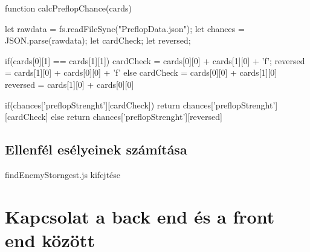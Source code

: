 \begin{python}
function calcPreflopChance(cards){
  let rawdata = fs.readFileSync("PreflopData.json");
  let chances = JSON.parse(rawdata);
  let cardCheck;
  let reversed;

  if(cards[0][1] == cards[1][1]){
    cardCheck = cards[0][0] + cards[1][0] + 'f';
    reversed = cards[1][0] + cards[0][0] + 'f'
  } else {
    cardCheck = cards[0][0] + cards[1][0]
    reversed = cards[1][0] + cards[0][0] 
  }

  if(chances['preflopStrenght'][cardCheck]){
    return chances['preflopStrenght'][cardCheck]
  } else {
    return chances['preflopStrenght'][reversed]
  }
}
\end{python}

\subsection{Ellenfél esélyeinek számítása}
findEnemyStorngest.js kifejtése

\section{Kapcsolat a back end és a front end között}